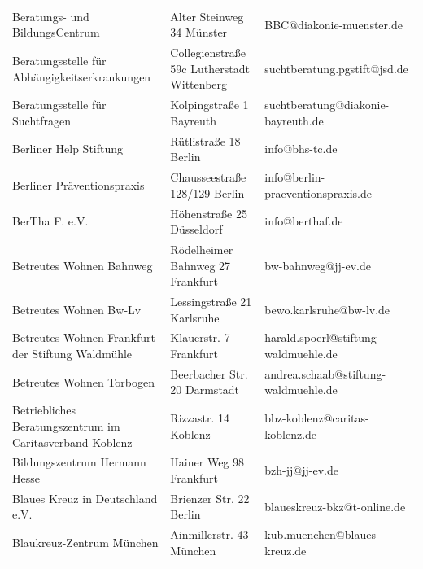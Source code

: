 {\begin{xltabular}{\textwidth} {
 >{\raggedright\arraybackslash}p{5cm}
 >{\raggedright\arraybackslash}X
 >{\raggedright\arraybackslash}p{5cm} }
Beratungs- und BildungsCentrum & Alter Steinweg 34 Münster & BBC@diakonie-muenster.de \\
Beratungsstelle für Abhängigkeitserkrankungen & Collegienstraße 59c Lutherstadt Wittenberg & suchtberatung.pgstift@jsd.de \\
Beratungsstelle für Suchtfragen & Kolpingstraße 1 Bayreuth & suchtberatung@diakonie-bayreuth.de \\
Berliner Help Stiftung & Rütlistraße 18 Berlin & info@bhs-tc.de \\
Berliner Präventionspraxis & Chausseestraße 128/129 Berlin & info@berlin-praeventionspraxis.de \\
BerTha F. e.V. & Höhenstraße 25 Düsseldorf & info@berthaf.de \\
Betreutes Wohnen Bahnweg & Rödelheimer Bahnweg 27 Frankfurt & bw-bahnweg@jj-ev.de \\
Betreutes Wohnen Bw-Lv & Lessingstraße 21 Karlsruhe & bewo.karlsruhe@bw-lv.de \\
Betreutes Wohnen Frankfurt der Stiftung Waldmühle & Klauerstr. 7 Frankfurt & harald.spoerl@stiftung-waldmuehle.de \\
Betreutes Wohnen Torbogen & Beerbacher Str. 20 Darmstadt & andrea.schaab@stiftung-waldmuehle.de \\
Betriebliches Beratungszentrum im Caritasverband Koblenz & Rizzastr. 14 Koblenz & bbz-koblenz@caritas-koblenz.de \\
Bildungszentrum Hermann Hesse & Hainer Weg 98 Frankfurt & bzh-jj@jj-ev.de \\
Blaues Kreuz in Deutschland e.V. & Brienzer Str. 22 Berlin & blaueskreuz-bkz@t-online.de \\
Blaukreuz-Zentrum München & Ainmillerstr. 43 München & kub.muenchen@blaues-kreuz.de \\

\end{xltabular}}
